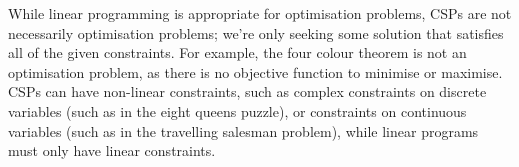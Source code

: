 While linear programming is appropriate for optimisation problems, CSPs are not necessarily optimisation problems; we're only seeking some solution that satisfies all of the given constraints. For example, the four colour theorem is not an optimisation problem, as there is no objective function to minimise or maximise. CSPs can have non-linear constraints, such as complex constraints on discrete variables (such as in the eight queens puzzle), or constraints on continuous variables (such as in the travelling salesman problem), while linear programs must only have linear constraints.




\newpage